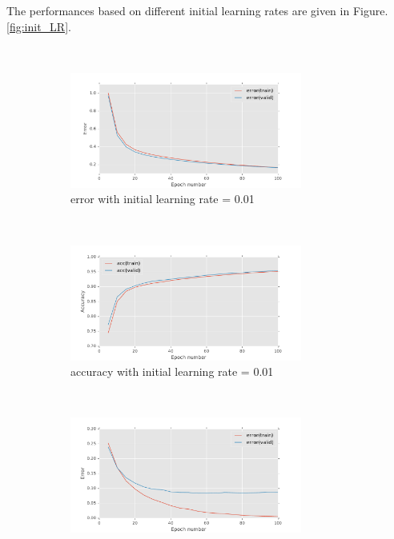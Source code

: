 \documentclass[11pt]{article}
\begin{document}
The performances based on different initial learning rates are given in  Figure.\ref{fig:init_LR}. 
\begin{figure}[t!]
    \centering
    ~
    \begin{subfigure}[t]{0.45\textwidth}
        \centering
        \includegraphics[height=1.5in]{error_with_init_LR_0_01.pdf}
        \caption{error with initial learning rate = 0.01}
    \end{subfigure}
	~
    \begin{subfigure}[t]{0.45\textwidth}
        \centering
        \includegraphics[height=1.5in]{acc_with_init_LR_0_01.pdf}
        \caption{accuracy with initial learning rate = 0.01}
    \end{subfigure}
    ~
    \begin{subfigure}[t]{0.45\textwidth}
        \centering
        \includegraphics[height=1.5in]{error_with_init_LR_0_1.pdf}

\end{subfigure}
\end{figure}
\end{document}
